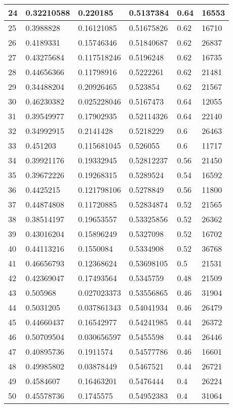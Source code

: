 \begin{longtable}{|l|l|l|l|l|l|}
24 & 0.32210588 & 0.220185 & 0.5137384 & 0.64 & 16553 \\ \hline 
25 & 0.3988828 & 0.16121085 & 0.51675826 & 0.62 & 16710 \\ \hline 
26 & 0.4189331 & 0.15746346 & 0.51840687 & 0.62 & 26837 \\ \hline 
27 & 0.43275684 & 0.117518246 & 0.5196248 & 0.62 & 16735 \\ \hline 
28 & 0.44656366 & 0.11798916 & 0.5222261 & 0.62 & 21481 \\ \hline 
29 & 0.34488204 & 0.20926465 & 0.523854 & 0.62 & 21567 \\ \hline 
30 & 0.46230382 & 0.025228046 & 0.5167473 & 0.64 & 12055 \\ \hline 
31 & 0.39549977 & 0.17902935 & 0.52114326 & 0.64 & 22140 \\ \hline 
32 & 0.34992915 & 0.2141428 & 0.5218229 & 0.6 & 26463 \\ \hline 
33 & 0.451203 & 0.115681045 & 0.526055 & 0.6 & 11717 \\ \hline 
34 & 0.39921176 & 0.19332945 & 0.52812237 & 0.56 & 21450 \\ \hline 
35 & 0.39672226 & 0.19268315 & 0.5289524 & 0.54 & 16592 \\ \hline 
36 & 0.4425215 & 0.121798106 & 0.5278849 & 0.56 & 11800 \\ \hline 
37 & 0.44874808 & 0.11720885 & 0.52834874 & 0.52 & 21565 \\ \hline 
38 & 0.38514197 & 0.19653557 & 0.53325856 & 0.52 & 26362 \\ \hline 
39 & 0.43016204 & 0.15896249 & 0.5327098 & 0.52 & 16702 \\ \hline 
40 & 0.44113216 & 0.1550084 & 0.5334908 & 0.52 & 36768 \\ \hline 
41 & 0.46656793 & 0.12368624 & 0.53698105 & 0.5 & 21531 \\ \hline 
42 & 0.42369047 & 0.17493564 & 0.5345759 & 0.48 & 21509 \\ \hline 
43 & 0.505968 & 0.027023373 & 0.53556865 & 0.46 & 31904 \\ \hline 
44 & 0.5031205 & 0.037861343 & 0.54041934 & 0.46 & 26479 \\ \hline 
45 & 0.44660437 & 0.16542977 & 0.54241985 & 0.44 & 26372 \\ \hline 
46 & 0.50709504 & 0.030656597 & 0.5455598 & 0.44 & 26446 \\ \hline 
47 & 0.40895736 & 0.1911574 & 0.54577786 & 0.46 & 16601 \\ \hline 
48 & 0.49985802 & 0.03878449 & 0.5467521 & 0.44 & 26721 \\ \hline 
49 & 0.4584607 & 0.16463201 & 0.5476444 & 0.4 & 26224 \\ \hline 
50 & 0.45578736 & 0.1745575 & 0.54952383 & 0.4 & 31064 \\ \hline 
\end{longtable}